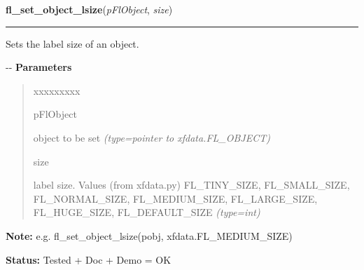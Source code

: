 \hspace{.8\funcindent}\begin{boxedminipage}{\funcwidth}

    \raggedright \textbf{fl\_set\_object\_lsize}(\textit{pFlObject}, \textit{size})

    \vspace{-1.5ex}

    \rule{\textwidth}{0.5\fboxrule}
\setlength{\parskip}{2ex}

Sets the label size of an object.

-{}-
\setlength{\parskip}{1ex}
      \textbf{Parameters}
      \vspace{-1ex}

      \begin{quote}
        \begin{Ventry}{xxxxxxxxx}

          \item[pFlObject]


object to be set
            {\it (type=pointer to xfdata.FL\_OBJECT)}

          \item[size]


label size. Values (from xfdata.py) FL\_TINY\_SIZE, FL\_SMALL\_SIZE,
FL\_NORMAL\_SIZE, FL\_MEDIUM\_SIZE, FL\_LARGE\_SIZE, FL\_HUGE\_SIZE,
FL\_DEFAULT\_SIZE
            {\it (type=int)}

        \end{Ventry}

      \end{quote}

\textbf{Note:} 
e.g. fl\_set\_object\_lsize(pobj, xfdata.FL\_MEDIUM\_SIZE)


\textbf{Status:} 
Tested + Doc + Demo = OK


    \end{boxedminipage}

    \label{xformslib:flbasic:fl_get_object_lsize}

    \vspace{0.5ex}

